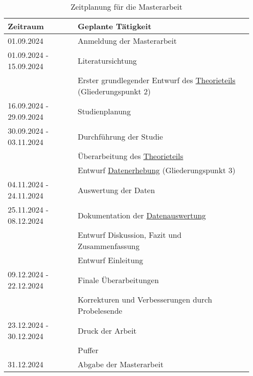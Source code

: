 \documentclass[11pt, a4paper]{article}
\begin{document}
\begin{table}[h]
\begin{tabularx}{\textwidth}{|X|X|}
	\hline
	\textbf{Zeitraum} & \textbf{Geplante Tätigkeit}\\
	\hline\hline
	01.09.2024 & Anmeldung der Masterarbeit\\
	\hline
	01.09.2024 - 15.09.2024 & Literatursichtung\\
	& Erster grundlegender Entwurf des \hyperref[bisherige-forschung]{Theorieteils} (Gliederungspunkt 2)\\
	\hline
	16.09.2024 - 29.09.2024 & Studienplanung\\
	\hline
	30.09.2024 - 03.11.2024 & Durchführung der Studie\\
	& Überarbeitung des \hyperref[bisherige-forschung]{Theorieteils}\\
	& Entwurf \hyperref[datenerhebung]{Datenerhebung} (Gliederungspunkt 3)\\
	\hline
	04.11.2024 - 24.11.2024 & Auswertung der Daten\\
	\hline
	25.11.2024 - 08.12.2024 & Dokumentation der \hyperref[auswertung]{Datenauswertung}\\
	& Entwurf Diskussion, Fazit und Zusammenfassung\\
	& Entwurf Einleitung\\
	\hline
	09.12.2024 - 22.12.2024 & Finale Überarbeitungen\\
	& Korrekturen und Verbesserungen durch Probelesende\\
	\hline
	23.12.2024 - 30.12.2024 & Druck der Arbeit\\
	& Puffer\\
	\hline
	31.12.2024 & Abgabe der Masterarbeit\\
	\hline
\end{tabularx}
\caption{Zeitplanung für die Masterarbeit}
\label{tab:zeitplanung}
\end{table}

\newpage


\end{document}
